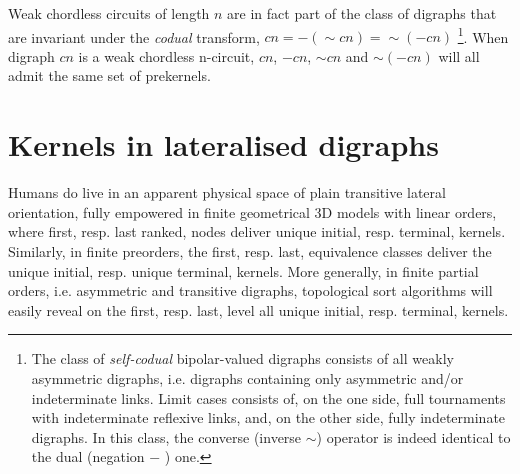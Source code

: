 Weak chordless circuits of length $n$ are in fact part of the class of digraphs that are invariant under the \emph{codual} transform, $cn = - (\sim cn) = \sim (-cn )$ \footnote{The class of \emph{self-codual} bipolar-valued digraphs consists of all weakly asymmetric digraphs, i.e. digraphs containing only asymmetric and/or indeterminate links. Limit cases consists of, on the one side, full tournaments with indeterminate reflexive links, and, on the other side, fully indeterminate digraphs. In this class, the converse (inverse $\sim$) operator is indeed identical to the dual (negation $-$ ) one.}. When digraph $cn$ is a weak chordless n-circuit, $cn$, $-cn$, $\sim cn$ and $\sim (-cn)$ will all admit the same set of prekernels.  

\section{Kernels in lateralised digraphs}
\label{sec:17.3}

Humans do live in an apparent physical space of plain transitive lateral orientation, fully empowered in finite geometrical 3D models with linear orders, where first, resp. last ranked, nodes deliver unique initial, resp. terminal, kernels. Similarly, in finite preorders, the first, resp. last, equivalence classes deliver the unique initial, resp. unique terminal, kernels. More generally, in finite partial orders, i.e. asymmetric and transitive digraphs, topological sort algorithms will easily reveal on the first, resp. last, level all unique initial, resp. terminal, kernels.

